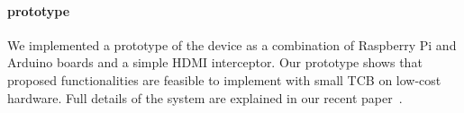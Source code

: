 

\paragraph{\protection prototype} 
We implemented a prototype of the \hub device as a combination of Raspberry Pi and Arduino boards and a simple HDMI interceptor. Our prototype shows that proposed functionalities are feasible to implement with small TCB on low-cost hardware. Full details of the \protection system are explained in our recent paper~\cite{protection}.


